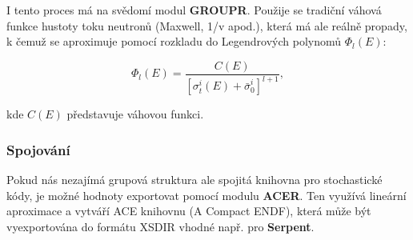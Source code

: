 I tento proces má na svědomí modul \textbf{GROUPR}. Použije se tradiční váhová funkce hustoty toku neutronů (Maxwell, 1/v apod.), která má ale reálně propady, k čemuž se aproximuje pomocí rozkladu do Legendrových polynomů $\Phi_l(E)$:

$$\Phi_l(E) = \dfrac{C(E)}{\left [ \sigma_t^i(E) + \bar{\sigma}_0^i \right ]^{l+1}},$$

\noindent kde $C(E)$ představuje váhovou funkci.

\subsubsection{Spojování}

Pokud nás nezajímá grupová struktura ale spojitá knihovna pro stochastické kódy, je možné hodnoty exportovat pomocí modulu \textbf{ACER}. Ten využívá lineární aproximace a vytváří ACE knihovnu (A Compact ENDF), která může být vyexportována do formátu XSDIR vhodné např. pro \textbf{Serpent}.